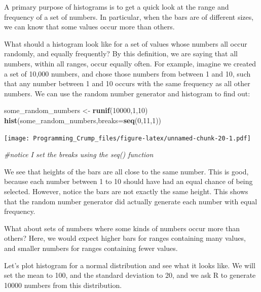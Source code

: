 \documentclass[]{book}
\newenvironment{Shaded}{\begin{snugshade}}{\end{snugshade}}
\newcommand{\KeywordTok}[1]{\textcolor[rgb]{0.13,0.29,0.53}{\textbf{{#1}}}}
\newcommand{\DataTypeTok}[1]{\textcolor[rgb]{0.13,0.29,0.53}{{#1}}}
\newcommand{\DecValTok}[1]{\textcolor[rgb]{0.00,0.00,0.81}{{#1}}}
\newcommand{\StringTok}[1]{\textcolor[rgb]{0.31,0.60,0.02}{{#1}}}
\newcommand{\CommentTok}[1]{\textcolor[rgb]{0.56,0.35,0.01}{\textit{{#1}}}}
\newcommand{\NormalTok}[1]{{#1}}
\theoremstyle{definition}
\theoremstyle{definition}
\theoremstyle{definition}
\theoremstyle{remark}
\begin{document}
A primary purpose of histograms is to get a quick look at the range and
frequency of a set of numbers. In particular, when the bars are of
different sizes, we can know that some values occur more than others.

What should a histogram look like for a set of values whose numbers all
occur randomly, and equally frequently? By this definition, we are
saying that all numbers, within all ranges, occur equally often. For
example, imagine we created a set of 10,000 numbers, and chose those
numbers from between 1 and 10, such that any number between 1 and 10
occurs with the same frequency as all other numbers. We can use the
random number generator and histogram to find out:

\begin{Shaded}
\begin{Highlighting}[]
\NormalTok{some_random_numbers <-}\StringTok{ }\KeywordTok{runif}\NormalTok{(}\DecValTok{10000}\NormalTok{,}\DecValTok{1}\NormalTok{,}\DecValTok{10}\NormalTok{)}
\KeywordTok{hist}\NormalTok{(some_random_numbers,}\DataTypeTok{breaks=}\KeywordTok{seq}\NormalTok{(}\DecValTok{0}\NormalTok{,}\DecValTok{11}\NormalTok{,}\DecValTok{1}\NormalTok{))}
\end{Highlighting}
\end{Shaded}

\texttt{[image: Programming\_Crump\_files/figure-latex/unnamed-chunk-20-1.pdf]}

\begin{Shaded}
\begin{Highlighting}[]
\CommentTok{#notice I set the breaks using the seq() function}
\end{Highlighting}
\end{Shaded}

We see that heights of the bars are all close to the same number. This
is good, because each number between 1 to 10 should have had an equal
chance of being selected. However, notice the bars are not exactly the
same height. This shows that the random number generator did actually
generate each number with equal frequency.

What about sets of numbers where some kinds of numbers occur more than
others? Here, we would expect higher bars for ranges containing many
values, and smaller numbers for ranges containing fewer values.

Let's plot histogram for a normal distribution and see what it looks
like. We will set the mean to 100, and the standard deviation to 20, and
we ask R to generate 10000 numbers from this distribution.
\end{document}
